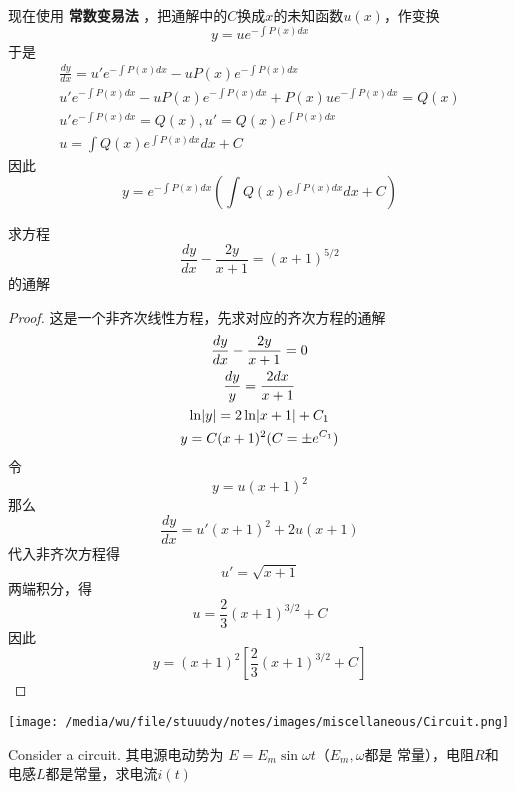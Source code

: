 \documentclass[11pt]{article}
\begin{document}
现在使用 \textbf{常数变易法} ，把通解中的\(C\)换成\(x\)的未知函数\(u(x)\)，作变换
\begin{equation*}
y=ue^{-\int P(x)dx}
\end{equation*}
于是
\begin{gather*}
\frac{dy}{dx}=u'e^{-\int P(x)dx}-uP(x)e^{-\int P(x)dx}\\
u'e^{-\int P(x)dx}-uP(x)e^{-\int P(x)dx}+P(x)ue^{-\int P(x)dx}=Q(x)\\
u'e^{-\int P(x)dx}=Q(x),u'=Q(x)e^{\int P(x)dx}\\
u=\int Q(x)e^{\int P(x)dx}dx+C
\end{gather*}
因此
\begin{equation*}
y=e^{-\int P(x)dx}   (\int Q(x)e^{\int P(x)dx}dx+C)
\end{equation*}

\begin{proposition}[]
求方程
\begin{equation*}
\frac{dy}{dx}-\frac{2y}{x+1}=(x+1)^{5/2}
\end{equation*}
的通解
\end{proposition}

\begin{proof}
这是一个非齐次线性方程，先求对应的齐次方程的通解
\begin{gather*}
\frac{dy}{dx}-\frac{2y}{x+1}=0\\
\frac{dy}{y}=\frac{2dx}{x+1}\\
\ln\abs{y}=2\ln\abs{x+1}+C_1\\
y=C(x+1)^2(C=\pm e^{C_1})
\end{gather*}
令
\begin{equation*}
y=u(x+1)^2
\end{equation*}
那么
\begin{equation*}
\frac{dy}{dx}=u'(x+1)^2+2u(x+1)
\end{equation*}
代入非齐次方程得
\begin{equation*}
u'=\sqrt{x+1}
\end{equation*}
两端积分，得
\begin{equation*}
u=\frac{2}{3}(x+1)^{3/2}+C
\end{equation*}
因此
\begin{equation*}
y=(x+1)^2[\frac{2}{3}(x+1)^{3/2}+C]
\end{equation*}
\end{proof}



\begin{proposition}[]


\begin{center}
\texttt{[image: /media/wu/file/stuuudy/notes/images/miscellaneous/Circuit.png]}
\end{center}
Consider a circuit. 其电源电动势为 \(E=E_m\sin\omega t\)（\(E_m,\omega\)都是
常量），电阻\(R\)和电感\(L\)都是常量，求电流\(i(t)\)
\end{proposition}
\end{document}
